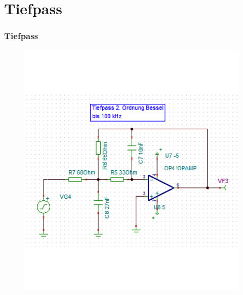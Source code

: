 \section{Tiefpass}
\begin{frame}
    \frametitle{Tiefpass}
    \begin{figure}
        \begin{minipage}{0.45\textwidth}
            \includegraphics[width=\textwidth]{fig/Tiefpass_Filter_Schema.png}
        \end{minipage}
        \begin{minipage}{0.45\textwidth}

\end{minipage}
\end{figure}
\end{frame}

